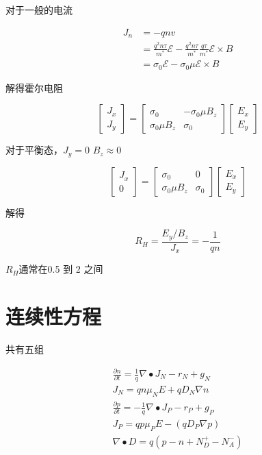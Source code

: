 \documentclass[cn,11pt,chinese,black,simple]{../elegantbook}
\begin{document}
对于一般的电流 

\[\begin{aligned}
    J _{n} &=-q n v \\
    &=\frac{q^{2} n \tau}{m^{*}} \mathscr{E} -\frac{q^{2} n \tau}{m^{*}} \frac{q \tau}{m^{*}} \mathscr{E} \times B \\
    &=\sigma_{0} \mathscr{E} -\sigma_{0} \mu \mathscr{E} \times B
\end{aligned}\]


解得霍尔电阻

\[\left[\begin{array}{c}
    J_{x} \\
    J_{y}
    \end{array}\right]=\left[\begin{array}{cc}
    \sigma_{0} & -\sigma_{0} \mu B_{z} \\
    \sigma_{0} \mu B_{z} & \sigma_{0}
    \end{array}\right]\left[\begin{array}{c}
    E_{x} \\
    E_{y}
\end{array}\right]\]

对于平衡态，\(J_y = 0\) \(B_z \approx 0\)

\[\left[\begin{array}{c}
    J_{x} \\
    0
    \end{array}\right]=\left[\begin{array}{cc}
    \sigma_{0} & 0 \\
    \sigma_{0} \mu B_{z} & \sigma_{0}
    \end{array}\right]\left[\begin{array}{c}
    E_{x} \\
    E_{y}
\end{array}\right]\]

解得

\[R_H = \dfrac{E_y/B_z}{J_x} = - \dfrac{1}{q n}\]

\(R_H\)通常在0.5 到 2 之间

\section{连续性方程}

共有五组

\[\begin{array}{l}
    \frac{\partial n}{\partial t}=\frac{1}{q} \nabla \bullet J _{N}-r_{N}+g_{N} \\
    J _{N}=q n \mu_{N} E+q D_{N} \nabla n \\
    \frac{\partial p}{\partial t}=-\frac{1}{q} \nabla \bullet J _{P}-r_{P}+g_{P} \\
    J _{P}=q p \mu_{P} E-\left(q D_{P} \nabla p\right) \\
    \nabla \bullet D=q\left(p-n+N_{D}^{+}-N_{A}^{-}\right)
\end{array}\]
\end{document}
